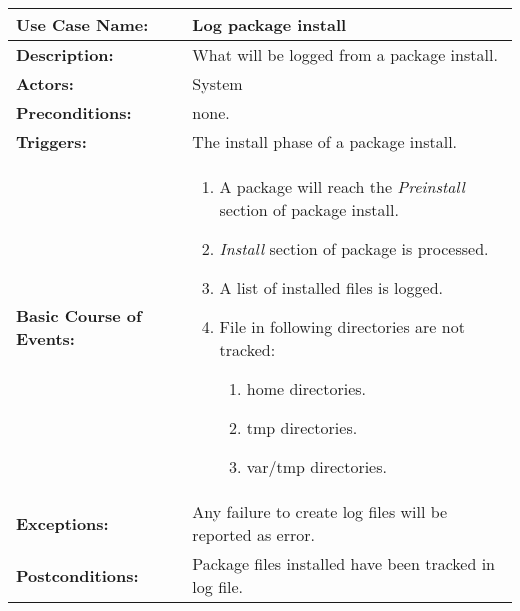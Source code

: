 
\begin{tabularx}{\linewidth}{|l|X|}
\hline
\textbf{Use Case Name:} & \textbf{Log package install} \\
\hline
\textbf{Description:} & 
What will be logged from a package install. \\
\hline
\textbf{Actors:} & System \\
\hline
\textbf{Preconditions:} & none. \\
\hline
\textbf{Triggers:} & The install phase of a package install. \\
\hline
\textbf{Basic Course of Events:} & 
\begin{minipage}{\linewidth} 
  \vspace{0.05em}
  \begin{enumerate}
    \item A package will reach the \emph{Preinstall} section of package install.
    \item \emph{Install} section of package is processed.
    \item A list of installed files is logged.
    \item File in following directories are not tracked:
      \begin{enumerate}
        \item home directories.
        \item tmp directories.
        \item var/tmp directories.
      \end{enumerate}
  \end{enumerate}
  \vspace{0.05em}
\end{minipage}
\\
\hline
\textbf{Exceptions:} & 
Any failure to create log files will be reported as error. \\
\hline 
\textbf{Postconditions:} &
Package files installed have been tracked in log file. \\
\hline
\end{tabularx}


